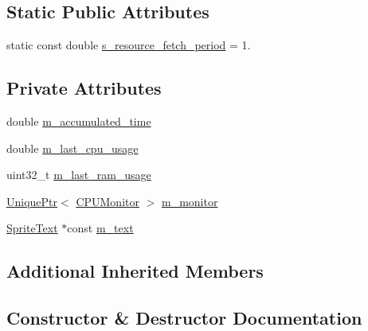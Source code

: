\subsection*{Static Public Attributes}
\begin{DoxyCompactItemize}
\item 
static const double \hyperlink{classmage_1_1_system_usage_script_a1c6b08be09a34ebd4515f6c09622afbd}{s\+\_\+resource\+\_\+fetch\+\_\+period} = 1.
\end{DoxyCompactItemize}
\subsection*{Private Attributes}
\begin{DoxyCompactItemize}
\item 
double \hyperlink{classmage_1_1_system_usage_script_ab8df9ff99617df9010c4c2f27a6ff9c8}{m\+\_\+accumulated\+\_\+time}
\item 
double \hyperlink{classmage_1_1_system_usage_script_a4a49987cd15cdc2fa3d550a542191621}{m\+\_\+last\+\_\+cpu\+\_\+usage}
\item 
uint32\+\_\+t \hyperlink{classmage_1_1_system_usage_script_a64538d152d33546516a6acdda939b619}{m\+\_\+last\+\_\+ram\+\_\+usage}
\item 
\hyperlink{namespacemage_a3316d7143a973e37adf1110f2e80ca31}{Unique\+Ptr}$<$ \hyperlink{classmage_1_1_c_p_u_monitor}{C\+P\+U\+Monitor} $>$ \hyperlink{classmage_1_1_system_usage_script_a45574bef4a526bdd99108e92bf12dcbd}{m\+\_\+monitor}
\item 
\hyperlink{classmage_1_1_sprite_text}{Sprite\+Text} $\ast$const \hyperlink{classmage_1_1_system_usage_script_a8875656163d9c9dfdfadd02c4e008eff}{m\+\_\+text}
\end{DoxyCompactItemize}
\subsection*{Additional Inherited Members}


\subsection{Constructor \& Destructor Documentation}
\hypertarget{classmage_1_1_system_usage_script_a4a94f0c3bae3ba17931bddc5919d547a}{}\label{classmage_1_1_system_usage_script_a4a94f0c3bae3ba17931bddc5919d547a} 
